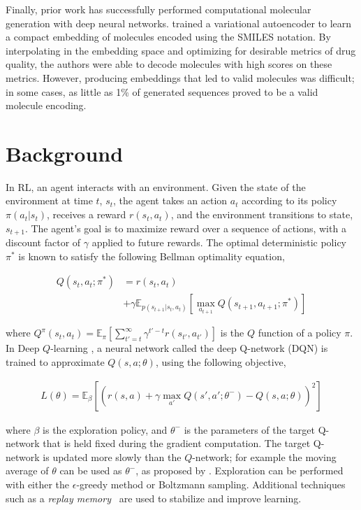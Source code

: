 Finally, prior work has successfully performed computational molecular generation with deep neural networks. \citet{gomez2016automatic} trained a variational autoencoder to learn a compact embedding of molecules encoded using the SMILES notation. By interpolating in the embedding space and optimizing for desirable metrics of drug quality, the authors were able to decode molecules with high scores on these metrics. However, producing embeddings that led to valid molecules was difficult; in some cases, as little as 1\% of generated sequences proved to be a valid molecule encoding. 

\section{Background}
\label{sec:dqn_background}

In RL, an agent interacts with an environment. Given the state of the environment at time $t$, $s_t$, the agent takes an action $a_t$ according to its policy $\pi(a_t|s_t)$, receives a reward $r(s_t,a_t)$, and the environment transitions to state, $s_{t+1}$. The agent's goal is to maximize reward over a sequence of actions, with a discount factor of $\gamma$ applied to future rewards. The optimal deterministic policy $\pi^*$ is known to satisfy the following Bellman optimality equation,

\begin{align} 
\label{eq:optimal_q}
Q(s_t,a_t;\pi^*) &= r(s_t,a_t) \\
&+ \gamma \mathbb{E}_{p(s_{t+1}|s_t,a_t)}[\max_{a_{t+1}} Q(s_{t+1},a_{t+1};\pi^*)] \nonumber
\end{align}

where $Q^\pi(s_t,a_t) = \mathbb{E}_{\pi}[\sum_{t'=t}^{\infty} \gamma^{t'-t}r(s_{t'},a_{t'})]$ is the $Q$ function of a policy $\pi$. 
In Deep $Q$-learning \citep{dqn}, a neural network called the deep Q-network (DQN) is trained to approximate $Q(s, a; \theta)$, using the following objective,

\begin{align} 
\label{eq:qloss}
L(\theta) = \mathbb{E}_{\beta}[(r(s,a) + \gamma \max_{a'}Q(s',a';\theta^-) - Q(s,a;\theta))^2]
\end{align}

where $\beta$ is the exploration policy, and $\theta^-$ is the parameters of the target Q-network \citep{dqn} that is held fixed during the gradient computation. The target Q-network is updated more slowly than the $Q$-network; for example the moving average of $\theta$ can be used as $\theta^-$, as proposed by \citet{lhphe-ccdrl-16}. 
Exploration can be performed with either the $\epsilon$-greedy method or Boltzmann sampling. Additional techniques such as a \emph{replay memory}~\citep{dqn} are used to stabilize and improve learning.


